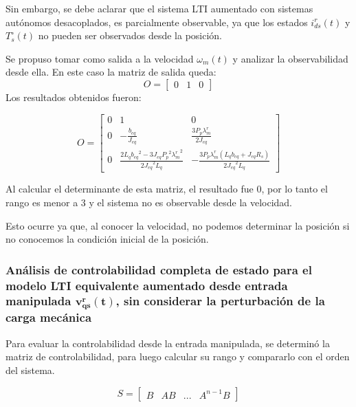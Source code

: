\documentclass[a4paper, 10pt, onecolumn,journal]{ieeeconf}
\begin{document}
Sin embargo, se debe aclarar que el sistema LTI aumentado con sistemas autónomos desacoplados, es parcialmente observable, ya que los estados ${i}^r_{ds}(t) $ y ${T}^\circ_s(t)$ no pueden ser observados desde la posición.

Se propuso tomar como salida a la velocidad ${\omega}_m(t)$ y analizar la observabilidad desde ella. En este caso la matriz de salida queda:
\begin{equation}
	O=
	\begin{bmatrix}
		0 & 1 & 0  
	\end{bmatrix}
	\label{Matriz C con velocidad como salida}
\end{equation}
Los resultados obtenidos fueron:

\begin{equation}
	O=
	\begin{bmatrix}
		0 & 1 & 0 \\ 
		0 & -\frac{b_{eq}}{J_{eq}} &\frac{3 P_p \lambda^r_m}{2 J_{eq}}\\
		0 & \frac{2 L_q {b_{eq}}^2 - 3 J_{eq} {P_p}^2 {\lambda^r_m}^2} {2 {J_{eq}}^2 L_q} & -\frac{3 P_p \lambda^r_m \left(L_q b_{eq} + J_{eq} R_s \right)}{2 {J_{eq}}^2 L_q}  
	\end{bmatrix}
	\label{Matriz de observabilidad desde velocidad del LTI }
\end{equation}


Al calcular el determinante de esta matriz, el resultado fue 0, por lo tanto el rango es menor a 3 y el sistema no es observable desde la velocidad.

Esto ocurre ya que, al conocer la velocidad, no podemos determinar la posición si no conocemos la condición inicial de la posición.

\subsubsection{\textbf{Análisis de controlabilidad completa de estado para el modelo LTI equivalente aumentado desde entrada manipulada $\mathbf{v^r_{qs}(t)}$, sin considerar la perturbación de la carga mecánica}}
Para evaluar la controlabilidad desde la entrada manipulada, se determinó la matriz de controlabilidad, para luego calcular su rango y compararlo con el orden del sistema.

\begin{equation}
	S=
	\begin{bmatrix}
		B & AB & ... & A^{n-1}B  
	\end{bmatrix}
	\label{Matriz de controlabilidad generica}
\end{equation}
\end{document}
